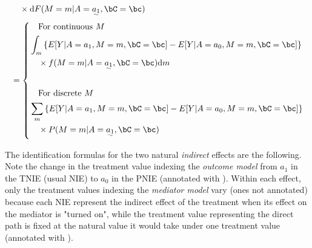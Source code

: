 \documentclass[10pt]{article}
\begin{document}
\begin{align*}
  &~~~ \times \mathrm{d}F(M = m | A = \uwave{a_{1}}, \bC = \bc)\\
  &= \left\{
  \begin{aligned}
  &~~~\text{For continuous }M\\
  &\int_{m} \left\{ E[Y | A = a_{1}, M = m, \bC = \bc] - E[Y | A = a_{0}, M = m, \bC = \bc] \right\}\\
  &~~~ \times f(M = m | A = \uwave{a_{1}}, \bC = \bc) \mathrm{d}m\\
  &\\
  &~~~\text{For discrete }M\\
  &\sum_{m} \left\{ E[Y | A = a_{1}, M = m, \bC = \bc] - E[Y | A = a_{0}, M = m, \bC = \bc] \right\}\\
  &~~~ \times P(M = m | A = \uwave{a_{1}}, \bC = \bc)\\
  \end{aligned}
\right .\\
\end{align*}

The identification formulas for the two natural \emph{indirect} effects are the following. Note the change in the treatment value indexing the \emph{outcome model} from \(a_{1}\) in the TNIE (usual NIE) to \(a_{0}\) in the PNIE (annotated with \uwave{~~~~}). Within each effect, only the treatment values indexing the \emph{mediator model} vary (ones not annotated) because each NIE represent the indirect effect of the treatment when its effect on the mediator is "turned on", while the treatment value representing the direct path is fixed at the natural value it would take under one treatment value (annotated with \uwave{~~~~}).
\end{document}

